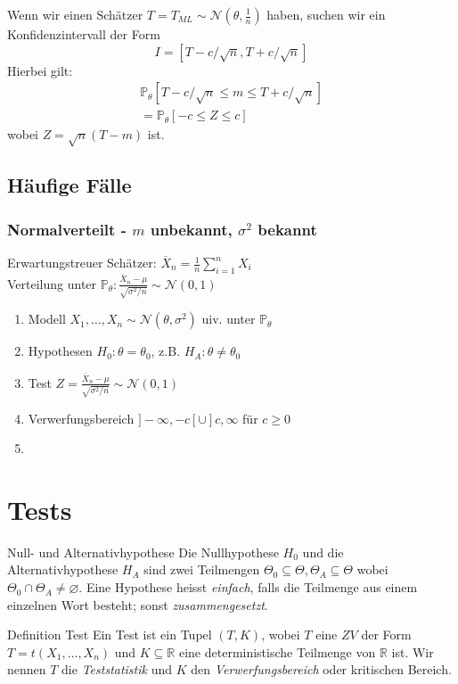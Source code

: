 \documentclass[a4paper,10pt]{article}
\def\R{\mathbb{R}}
\def\P{\mathbb{P}}
\begin{document}
Wenn wir einen Schätzer \(T = T_{ML} \sim \mathcal{N}(\theta, \frac{1}{n})\) haben, suchen wir ein Konfidenzintervall der Form
\[I = [T-c/\sqrt{n}, T+c/\sqrt{n}]\]
Hierbei gilt:
\begin{align*}
    \P_\theta[T-c/\sqrt{n} \le m \le T+c/\sqrt{n}] \\
    = \P_\theta[-c\le Z \le c]
\end{align*}
wobei \(Z = \sqrt{n}(T-m)\) ist.

\subsection{Häufige Fälle}
\subsubsection{\texorpdfstring{Normalverteilt - \(m\) unbekannt, \(\sigma^2\) bekannt}{Normalverteilt - m unbekannt, σ² bekannt}}
Erwartungstreuer Schätzer: \(\overline{X}_n = \frac{1}{n} \sum_{i=1}^n X_i\)\\
Verteilung unter \(\P_\theta: \frac{\overline{X}_n - \mu}{\sqrt{\sigma^2/n}} \sim \mathcal{N}(0,1)\)
\begin{enumerate}
    \item Modell \(X_1, \ldots, X_n \sim \mathcal{N}(\theta, \sigma^2)\) uiv. unter \(\P_\theta\)
    \item Hypothesen \(H_0 : \theta = \theta_0\), z.B. \(H_A : \theta \ne \theta_0\)
    \item Test \(Z = \frac{\overline{X}_n - \mu}{\sqrt{\sigma^2/n}} \sim \mathcal{N}(0,1)\)
    \item Verwerfungsbereich \(]-\infty, -c[ \cup ] c, \infty\) für \(c\ge 0\)
    \item
\end{enumerate}

\section{Tests}
\begin{subbox}{Null- und Alternativhypothese}
    Die Nullhypothese \(H_0\) und die Alternativhypothese \(H_A\) sind zwei Teilmengen \(\Theta_0 \subseteq \Theta, \Theta_A \subseteq \Theta\) wobei \(\Theta_0 \cap \Theta_A \ne \varnothing\). Eine Hypothese heisst \textit{einfach}, falls die Teilmenge aus einem einzelnen Wort besteht; sonst \textit{zusammengesetzt}.
\end{subbox}

\begin{mainbox}{Definition Test}
    Ein Test ist ein Tupel \((T,K)\), wobei \(T\) eine \(ZV\) der Form \(T=t(X_1, \ldots, X_n)\) und \(K \subseteq \R\) eine deterministische Teilmenge von \(\R\) ist. Wir nennen \(T\) die \textit{Teststatistik} und \(K\) den \textit{Verwerfungsbereich} oder kritischen Bereich.
\end{mainbox}
\end{document}
